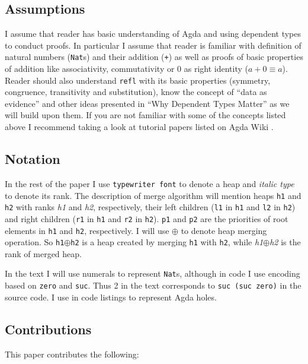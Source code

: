 \subsection{Assumptions}

I assume that reader has basic understanding of Agda and using dependent types to conduct proofs. In particular I assume that reader is familiar with definition of natural numbers (\texttt{Nat}s) and their addition (\texttt{+}) as well as proofs of basic properties of addition like associativity, commutativity or 0 as right identity ($a + 0 ≡ a$). Reader should also understand \texttt{refl} with its basic properties (symmetry, congruence, transitivity and substitution), know the concept of ``data as evidence'' and other ideas presented in ``Why Dependent Types Matter'' \cite{AltMcBMcK05} as we will build upon them. If you are not familiar with some of the concepts listed above I recommend taking a look at tutorial papers listed on Agda Wiki \cite{agda-wiki}.

\subsection{Notation}

In the rest of the paper I use \texttt{typewriter font} to denote a heap and \textit{italic type} to denote its rank. The description of merge algorithm will mention heaps \texttt{h1} and \texttt{h2} with ranks \textit{h1} and \textit{h2}, respectively, their left children (\texttt{l1} in \texttt{h1} and \texttt{l2} in \texttt{h2}) and right children (\texttt{r1} in \texttt{h1} and \texttt{r2} in \texttt{h2}). \texttt{p1} and \texttt{p2} are the priorities of root elements in \texttt{h1} and \texttt{h2}, respectively. I will use $\oplus$ to denote heap merging operation. So \texttt{h1}$\oplus$\texttt{h2} is a heap created by merging \texttt{h1} with \texttt{h2}, while \textit{h1}$\oplus$\textit{h2} is the rank of merged heap.

In the text I will use numerals to represent \texttt{Nat}s, although in code I use encoding based on \texttt{zero} and \texttt{suc}. Thus 2 in the text corresponds to \texttt{suc (suc zero)} in the source code. I use \texttt{} in code listings to represent Agda holes.

\subsection{Contributions}

This paper contributes the following:


